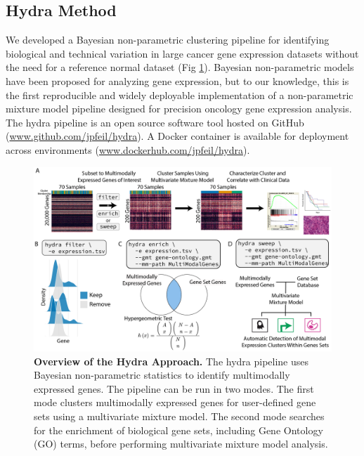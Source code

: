 \documentclass[10pt,letterpaper]{article}
\begin{document}
\subsection{Hydra Method}
We developed a Bayesian non-parametric clustering pipeline for identifying biological and technical variation in large cancer gene expression datasets without the need for a reference normal dataset (Fig \ref{overview}). Bayesian non-parametric models have been proposed for analyzing gene expression, but to our knowledge, this is the first reproducible and widely deployable implementation of a non-parametric mixture model pipeline designed for precision oncology gene expression analysis. The hydra pipeline is an open source software tool hosted on GitHub (\url{www.github.com/jpfeil/hydra}). A Docker container is available for deployment across environments (\url{www.dockerhub.com/jpfeil/hydra}).

\begin{figure}[h!]
	\includegraphics[width=\textwidth]{"img/overview-fig"}
\caption{{\bf Overview of the Hydra Approach.}
		The hydra pipeline uses Bayesian non-parametric statistics to identify multimodally expressed genes. The pipeline can be run in two modes. The first mode clusters multimodally expressed genes for user-defined gene sets using a multivariate mixture model. The second mode searches for the enrichment of biological gene sets, including Gene Ontology (GO) terms, before performing multivariate mixture model analysis.
		\label{overview}}
\end{figure}
\end{document}
